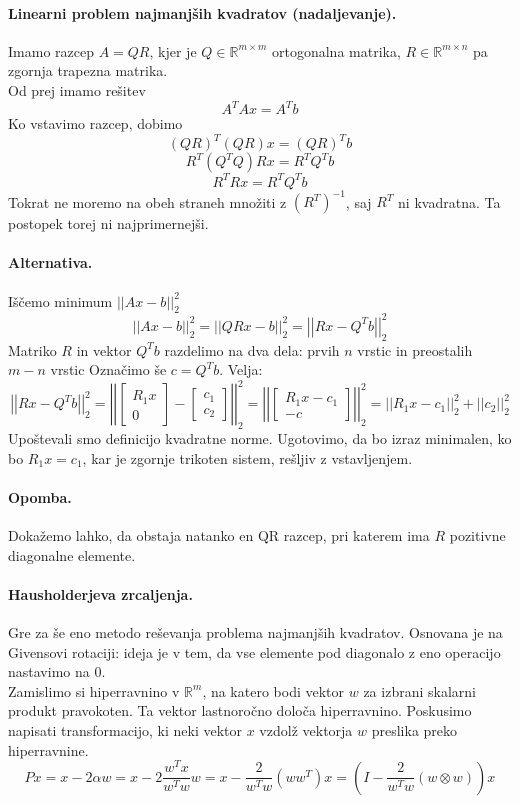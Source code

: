 \documentclass[a4paper]{article}
\newcommand{\R}{\mathbb{R}}
\newcommand{\norm}[1]{\left|\left|#1\right|\right|}
\begin{document}
\paragraph{Linearni problem najmanjših kvadratov (nadaljevanje).} Imamo razcep \(A = QR\), kjer je \(Q\in\R^{m \times m}\) ortogonalna matrika, \(R \in \R^{m \times n}\) pa zgornja trapezna matrika. \\[3mm]
Od prej imamo rešitev \[A^TA x = A^Tb\]
Ko vstavimo razcep, dobimo \[(QR)^T(QR)x = (QR)^Tb\]
\[R^T(Q^TQ)Rx = R^TQ^Tb\]
\[R^TRx = R^TQ^Tb\]
Tokrat ne moremo na obeh straneh množiti z \((R^T)^{-1}\), saj \(R^T\) ni kvadratna.
Ta postopek torej ni najprimernejši.
\paragraph{Alternativa.} Iščemo minimum \(||Ax-b||_2^2\)
\[\norm{Ax-b}_2^2 = \norm{QRx-b}_2^2 = \norm{Rx-Q^Tb}_2^2\]
Matriko \(R\) in vektor \(Q^Tb\) razdelimo na dva dela: prvih \(n\) vrstic in preostalih \(m-n\) vrstic Označimo še \(c = Q^Tb\).
Velja: \[\norm{Rx - Q^Tb}_2^2 = \norm{\begin{bmatrix}
    R_1x \\ 0
\end{bmatrix} - \begin{bmatrix}
    c_1 \\ c_2
\end{bmatrix}}_2^2 = \norm{\begin{bmatrix}
    R_1x - c_1 \\ -c
\end{bmatrix}}_2^2 = \norm{R_1x - c_1}_2^2 + \norm{c_2}_2^2\]
Upoštevali smo definicijo kvadratne norme. Ugotovimo, da bo izraz minimalen, ko bo \(R_1x = c_1\), kar je zgornje trikoten sistem, rešljiv z vstavljenjem.
\paragraph{Opomba.} Dokažemo lahko, da obstaja natanko en QR razcep, pri katerem ima \(R\) pozitivne diagonalne elemente.
\paragraph{Hausholderjeva zrcaljenja.} Gre za še eno metodo reševanja problema najmanjših kvadratov. Osnovana je na Givensovi rotaciji:
ideja je v tem, da vse elemente pod diagonalo z eno operacijo nastavimo na 0. \\[3mm]
Zamislimo si hiperravnino v \(\R^{m}\), na katero bodi vektor \(w\) za izbrani skalarni produkt pravokoten. Ta vektor lastnoročno določa hiperravnino.
Poskusimo napisati transformacijo, ki neki vektor \(x\) vzdolž vektorja \(w\) preslika preko hiperravnine.
\[Px = x - 2\alpha w = x - 2\frac{w^Tx}{w^Tw}w = x-\frac{2}{w^Tw}(ww^T)x = \left(I-\frac{2}{w^Tw}(w \otimes w)\right)x\]
\end{document}
